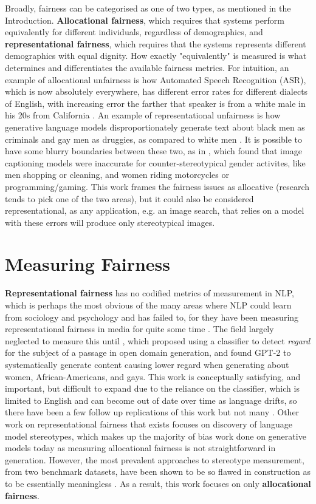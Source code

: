 Broadly, fairness can be categorised as one of two types, as mentioned in the Introduction. \textbf{Allocational fairness}, which requires that systems perform equivalently for different individuals, regardless of demographics, and \textbf{representational fairness}, which requires that the systems represents different demographics with equal dignity. How exactly "equivalently" is measured is what determines and differentiates the available fairness metrics. For intuition, an example of allocational unfairness is how Automated Speech Recognition (ASR), which is now absolutely everywhere, has different error rates for different dialects of English, with increasing error the farther that speaker is from a white male in his 20s from California \citep{tatman_2017}. An example of representational unfairness is how generative language models disproportionately generate text about black men as criminals and gay men as druggies, as compared to white men \citep{sheng-etal-2019-woman}. It is possible to have some blurry boundaries between these two, as in \citet{zhao-etal-2017-men}, which found that image captioning models were inaccurate for counter-stereotypical gender activites, like men shopping or cleaning, and women riding motorcycles or programming/gaming. This work frames the fairness issues as allocative (research tends to pick one of the two areas), but it could also be considered representational, as any application, e.g. an image search, that relies on a model with these errors will produce only stereotypical images.

\section{Measuring Fairness}
\textbf{Representational fairness} has no codified metrics of measurement in NLP, which is perhaps the most obvious of the many areas where NLP could learn from sociology and psychology and has failed to, for they have been measuring representational fairness in media for quite some time \citep{}. The field largely neglected to measure this until \citet{sheng-etal-2019-woman}, which proposed using a classifier to detect \textit{regard} for the subject of a passage in open domain generation, and found GPT-2 to systematically generate content causing lower regard when generating about women, African-Americans, and gays. This work is conceptually satisfying, and important, but difficult to expand due to the reliance on the classifier, which is limited to English and can become out of date over time as language drifts, so there have been a few follow up replications of this work but not many \citep{goldfarb-tarrant-etal-2023-prompt}. Other work on representational fairness that exists focuses on discovery of language model stereotypes, which makes up the majority of bias work done on generative models today \citep{goldfarb-tarrant-etal-2023-prompt} as measuring allocational fairness is not straightforward in generation. However, the most prevalent approaches to stereotype measurement, from two benchmark datasets, have been shown to be so flawed in construction as to be essentially meaningless \citep{blodgett-etal-2021-stereotyping}. As a result, this work focuses on only \textbf{allocational fairness}.

